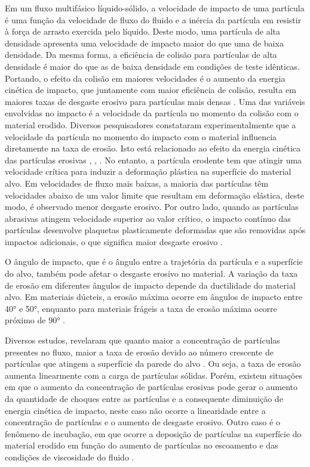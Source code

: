 Em um fluxo multifásico líquido-sólido, a velocidade de impacto de uma partícula é uma função da velocidade de fluxo do fluido e a inércia da partícula em resistir à força de arrasto exercida pelo líquido. Deste modo, uma partícula de alta densidade apresenta uma velocidade de impacto maior do que uma de baixa densidade. Da mesma forma, a eficiência de colisão para partículas de alta densidade é maior do que as de baixa densidade em condições de teste idênticas. Portando, o efeito da colisão em maiores velocidades é o aumento da energia cinética de impacto, que juntamente com maior eficiência de colisão, resulta em maiores taxas de desgaste erosivo para partículas mais densas \cite {clark2}.
Uma das variáveis envolvidas no impacto é a velocidade da partícula no momento da colisão com o material erodido. Diversos pesquisadores constataram experimentalmente que a velocidade da partícula no momento do impacto com o material influencia diretamente na taxa de erosão. Isto está relacionado ao efeito da energia cinética das partículas erosivas \cite {lind}, \cite {trus}, \cite {finnie2}. No entanto, a partícula erodente tem que atingir uma velocidade crítica para induzir a deformação plástica na superfície do material alvo. Em velocidades de fluxo mais baixas, a maioria das partículas têm velocidades abaixo de um valor limite que resultam em deformação elástica, deste modo, é observado menor desgaste erosivo. Por outro lado, quando as partículas abrasivas atingem velocidade superior ao valor crítico, o impacto contínuo das partículas desenvolve plaquetas plasticamente deformadas que são removidas após impactos adicionais, o que significa maior desgaste erosivo \cite {yabuki}.

O ângulo de impacto, que é o ângulo entre a trajetória da partícula e a superfície do alvo, também pode afetar o desgaste erosivo no material. A variação da taxa de erosão em diferentes ângulos de impacto depende da ductilidade do material alvo. Em materiais dúcteis, a erosão máxima ocorre em ângulos de impacto entre 40° e 50°, enquanto para materiais frágeis a taxa de erosão máxima ocorre próximo de 90° \cite{albu}.

Diversos estudos, revelaram que quanto maior a concentração de partículas presentes no fluxo, maior a taxa de erosão devido ao número crescente de partículas que atingem a superfície da parede do alvo \cite{gandhi}. Ou seja, a taxa de erosão aumenta linearmente com a carga de partículas sólidas. Porém, existem situações em que o aumento da concentração de partículas erosivas pode gerar o aumento da quantidade de choques entre as partículas e a consequente diminuição de energia cinética de impacto, neste caso não ocorre a linearidade entre a concentração de partículas e o aumento de desgaste erosivo.  Outro caso é o fenômeno de incubação, em que ocorre a deposição de partículas na superfície do material erodido em função do aumento de partículas no escoamento e das condições de viscosidade do fluido \cite{tsai}. 

